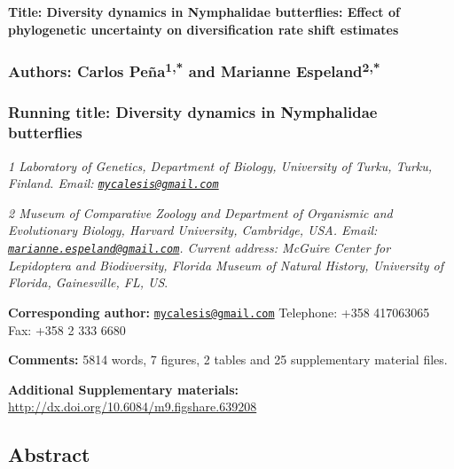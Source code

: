 \documentclass[]{article}
\author{}
\date{}
\begin{document}
\textbf{Title: Diversity dynamics in Nymphalidae butterflies: Effect of
phylogenetic uncertainty on diversification rate shift estimates}

\subsubsection{Authors: Carlos Peña\textsuperscript{1,*} and Marianne
Espeland\textsuperscript{2,*}}\label{authors-carlos-peuxf1a1-and-marianne-espeland2}

\subsubsection{Running title: Diversity dynamics in Nymphalidae
butterflies}\label{running-title-diversity-dynamics-in-nymphalidae-butterflies}

\emph{1 Laboratory of Genetics, Department of Biology, University of
Turku, Turku, Finland. Email:
\href{mailto:mycalesis@gmail.com}{\nolinkurl{mycalesis@gmail.com}}}

\emph{2 Museum of Comparative Zoology and Department of Organismic and
Evolutionary Biology, Harvard University, Cambridge, USA. Email:
\href{mailto:marianne.espeland@gmail.com}{\nolinkurl{marianne.espeland@gmail.com}}.
Current address: McGuire Center for Lepidoptera and Biodiversity,
Florida Museum of Natural History, University of Florida, Gainesville,
FL, US}.

\textbf{Corresponding author:}
\href{mailto:mycalesis@gmail.com}{\nolinkurl{mycalesis@gmail.com}}
Telephone: +358 417063065 Fax: +358 2 333 6680

\textbf{Comments:} 5814 words, 7 figures, 2 tables and 25 supplementary
material files.

\textbf{Additional Supplementary materials:}
\url{http://dx.doi.org/10.6084/m9.figshare.639208}

\subsection{Abstract}\label{abstract}
\end{document}
